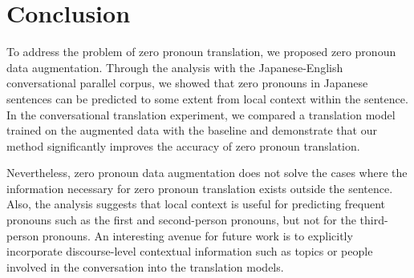 \section{Conclusion}
To address the problem of zero pronoun translation, we proposed zero pronoun data augmentation.
Through the analysis with the Japanese-English conversational parallel corpus, we showed that zero pronouns in Japanese sentences can be predicted to some extent from local context within the sentence.
In the conversational translation experiment, we compared a translation model trained on the augmented data with the baseline and demonstrate that our method significantly improves the accuracy of zero pronoun translation.

Nevertheless, zero pronoun data augmentation does not solve the cases where the information necessary for zero pronoun translation exists outside the sentence.  Also, the analysis suggests that local context is useful for predicting frequent pronouns such as the first and second-person pronouns, but not for the third-person pronouns.
An interesting avenue for future work is to explicitly incorporate discourse-level contextual information such as topics or people involved in the conversation into the translation models.
